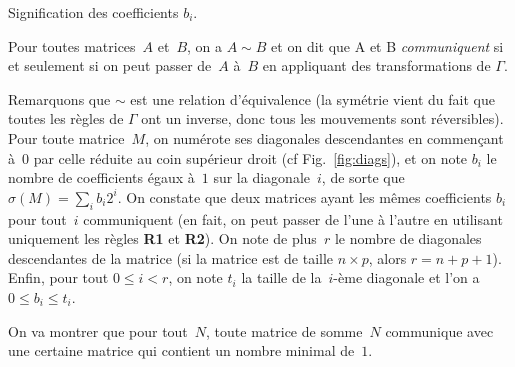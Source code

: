 \begin{floatingfigure}[r]{.3\textwidth}
\centering
\vspace{-.5em}
\caption{Signification des coefficients $b_i$.}
\label{fig:diags}
\end{floatingfigure}

\begin{df*}
Pour toutes matrices~$A$ et~$B$, on a $A\sim B$ et on dit que A et B \emph{communiquent} si et seulement si on peut passer de~$A$ à~$B$ en appliquant des transformations de $\Gamma$.
\end{df*}

Remarquons que $\sim$ est une relation d'équivalence (la symétrie vient du fait que toutes les règles de $\Gamma$ ont un inverse, donc tous les mouvements sont réversibles). Pour toute  matrice~$M$, on numérote  ses diagonales descendantes  en commençant
à~$0$ par celle réduite au coin supérieur droit (cf Fig.~\ref{fig:diags}), et on
note $b_i$ le nombre de coefficients  égaux à~$1$ sur la diagonale~$i$, de sorte
que  \mbox{$\sigma (M) =  \sum\limits_ib_i2^i$}. On  constate que  deux matrices
ayant les mêmes  coefficients $b_i$ pour tout~$i$ communiquent
(en fait, on  peut passer de l'une à l'autre en  utilisant uniquement les règles
\textbf{R1}  et \textbf{R2}).   On  note  de plus~$r$  le  nombre de  diagonales
descendantes de la matrice (si la matrice  est de taille $n\times p$, alors $r =
n+p+1$).  Enfin, pour tout $0\leq i <  r$, on note $t_i$ la taille de la~$i$-ème
diagonale et l'on a $0\leq b_i \leq t_i$.
 
On va montrer que pour tout~$N$, toute matrice de somme~$N$ communique avec une certaine matrice qui contient un nombre minimal de~$1$.

